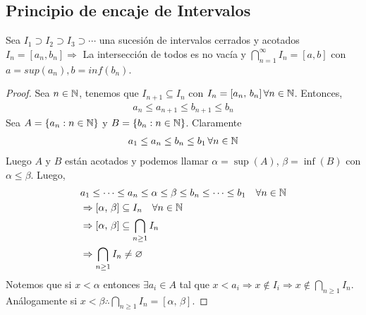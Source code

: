 \subsection{Principio de encaje de Intervalos}

\begin{theorem}
    Sea $I_1 \supset I_2 \supset I_3 \supset \cdots $ una sucesión de intervalos cerrados y acotados $I_n = [a_n, b_n] \Rightarrow$
    La intersección de todos es no vacía y $\bigcap_{n=1}^{\infty} I_n = [a,b]$ con $a = sup(a_n), b=inf(b_n)$.
    \begin{proof}
        Sea $n \in \mathbb{N}$, tenemos que $I_{n+1} \subseteq I_n$ con $I_n = [a_n\text{, } b_n] \, \forall n \in \mathbb{N}$. Entonces, \begin{align*}
            a_n \leq a_{n+1} \leq b_{n+1} \leq b_n
        \end{align*}
        Sea $A = \{ a_n : n \in \mathbb{N} \}$ y $B = \{ b_n : n \in \mathbb{N} \}$. Claramente \begin{align*}
            a_1 \leq a_n \leq b_n \leq b_1 \, \forall n \in \mathbb{N}
        \end{align*}
        Luego $A$ y $B$ están acotados y podemos llamar $\alpha = \sup(A)$, $\beta = \inf(B)$ con $\alpha \leq \beta$. Luego, \begin{align*}
             & a_1 \leq \cdots \leq a_n \leq \alpha \leq \beta \leq b_n \leq \cdots \leq b_1 \quad \forall n \in \mathbb{N} \\
             & \Rightarrow [\alpha\text{, }\beta] \subseteq I_n \quad \forall n \in \mathbb{N}                              \\
             & \Rightarrow [\alpha\text{, }\beta] \subseteq \bigcap_{n \geq 1} I_n                                  \\
             & \Rightarrow \bigcap_{n \geq 1} I_n \neq \varnothing
        \end{align*}
        Notemos que si $x < \alpha$ entonces $\exists a_i \in A$ tal que $x < a_i \Rightarrow x \notin I_i \Rightarrow x \notin \bigcap_{n \geq 1} I_n$.
        Análogamente si $x < \beta \therefore \bigcap_{n \geq 1} I_n = [\alpha\text{, }\beta]$.
    \end{proof}
\end{theorem}

